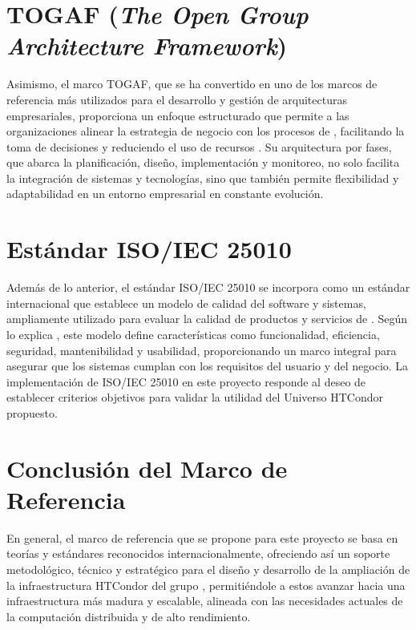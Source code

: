 \section{TOGAF (\textit{The Open Group Architecture Framework})}
\noindent
Asimismo, el marco TOGAF, que se ha convertido en uno de los marcos de referencia más utilizados para el desarrollo y gestión de arquitecturas empresariales, proporciona un enfoque estructurado que permite a las organizaciones alinear la estrategia de negocio con los procesos de \TI, facilitando la toma de decisiones y reduciendo el uso de recursos \citep{Mumtaza2025}. Su arquitectura por fases, que abarca la planificación, diseño, implementación y monitoreo, no solo facilita la integración de sistemas y tecnologías, sino que también permite flexibilidad y adaptabilidad en un entorno empresarial en constante evolución.

\section{Estándar ISO/IEC 25010}
\noindent
Además de lo anterior, el estándar ISO/IEC 25010 se incorpora como un estándar internacional que establece un modelo de calidad del software y sistemas, ampliamente utilizado para evaluar la calidad de productos y servicios de \TI. Según lo explica \cite{ISO25010}, este modelo define características como funcionalidad, eficiencia, seguridad, mantenibilidad y usabilidad, proporcionando un marco integral para asegurar que los sistemas cumplan con los requisitos del usuario y del negocio. La implementación de ISO/IEC 25010 en este proyecto responde al deseo de establecer criterios objetivos para validar la utilidad del Universo HTCondor propuesto.



\section{Conclusión del Marco de Referencia}
\noindent
En general, el marco de referencia que se propone para este proyecto se basa en teorías y estándares reconocidos internacionalmente, ofreciendo así un soporte metodológico, técnico y estratégico para el diseño y desarrollo de la ampliación de la infraestructura HTCondor del grupo \GRID, permitiéndole a estos avanzar hacia una infraestructura más madura y escalable, alineada con las necesidades actuales de la computación distribuida y de alto rendimiento.
